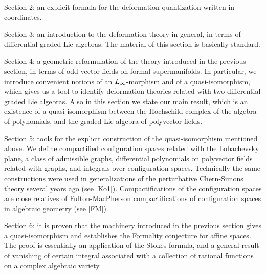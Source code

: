        Section 2: an explicit formula
         for the deformation quantization written in coordinates.
         
          Section 3: an introduction to the deformation theory
           in general, in terms of differential graded Lie algebras.
             The material of this section is basically standard.
              
           
            Section 4:  a geometric reformulation
             of the theory introduced in the previous section, in terms
              of odd vector fields on formal supermanifolds.
              In particular, we introduce convenient notions of
               an ${L_{\infty}}$-morphism and of a quasi-isomorphism, 
               which gives us a tool
                to identify deformation theories related with two 
                differential graded Lie algebras.
                 Also in this section we state our main result, which
                  is an existence of a quasi-isomorphism between
                   the Hochschild complex of the algebra of polynomials, and
                   the graded Lie algebra of polyvector fields.
                  
                  Section 5: tools
                   for  the explicit construction of the quasi-isomorphism
                    mentioned above.
                   We define compactified
                   configuration spaces related with the Lobachevsky
                   plane, a class of admissible graphs, differential 
                   polynomials on polyvector fields
                related with graphs, and integrals
                     over configuration spaces. Technically
                      the same constructions were used 
                       in   generalizations of the perturbative
                        Chern-Simons theory several years ago (see [Ko1]).
                 Compactifications of the configuration spaces
                  are close relatives of Fulton-MacPherson compactifications
                   of configuration spaces in algebraic geometry (see [FM]).
                     
                     
                     Section 6: it is proven that the machinery introduced
                      in the previous section gives a quasi-isomorphism
                       and establishes the Formality conjecture for affine
                        spaces.
                        The proof is essentially an application of the Stokes
                         formula, and a general result of vanishing
                         of certain integral associated with 
                          a collection of rational 
                        functions on a complex
                        algebraic  variety.
                        
